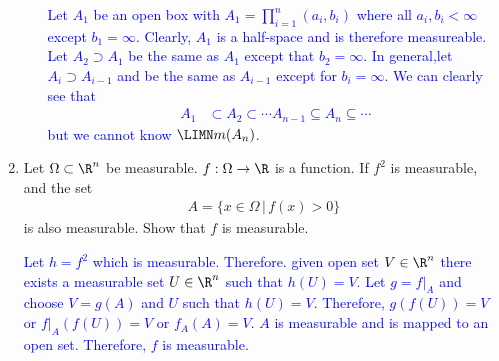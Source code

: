 \documentclass[10pt,a4paper]{report}
\newcommand{\BLUE}[1]{\textcolor{blue}{#1}}
\begin{document}
\begin{enumerate}[label=\Roman*.]
\begin{enumerate}[label=(\alph*)]
	\BLUE{Let $A_1$ be an open box with $A_1= \prod_{i=1}^n (a_i, b_i)$ where all $a_i, b_i < \infty$ except $b_1 = \infty$.  Clearly, $A_1$ is a half-space and is therefore measureable.  Let $A_2\supset A_1$ be the same as $A_1$ except that $b_2=\infty$.  In general,let $A_i\supset A_{i-1}$ and be the same as $A_{i-1}$ except for $b_i = \infty$.  We can clearly see that 
	\begin{align*}
		A_1 &\subset A_2 \subset \cdots A_{n-1} \subseteq A_n \subseteq \cdots 
\end{align*}	but we cannot know $\LIMN m(A_n)$.
	}

\end{enumerate}

\item Let $\Omega \subset \R^n$ be measurable.  $f: \Omega \to \R$ is a function.  If $f^2$ is measurable, and the set 
\begin{align*}
	A=\{x\in\Omega\,|\, f(x) > 0\}
\end{align*}is also measurable.  Show that $f$ is measurable.

\BLUE{Let $h=f^2$ which is measurable.  Therefore. given open set $V \in \R^n$ there exists a measurable set $U \in \R^n$ such that $h(U) = V$. Let $g = f|_A$ and choose $V = g(A)$ and $U$ such that $h(U)=V$.  Therefore, $g(f(U))=V$ or $f|_A(f(U))=V$ or $f_A(A)=V$.  $A$ is measurable and is mapped to an open set.  Therefore, $f$ is measurable.
}

\end{enumerate}
\end{document}
